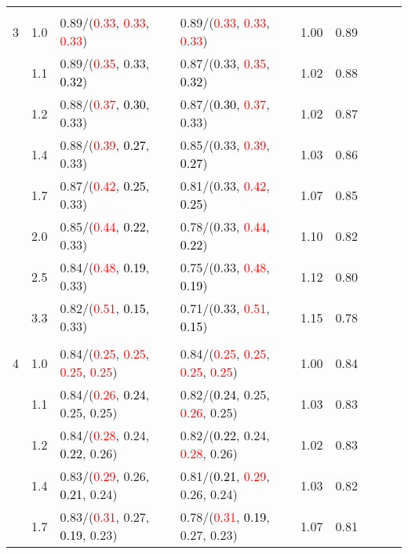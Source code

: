 \documentclass[10pt,a4paper]{report}
\begin{document}
\begin{table}[!htbp]
\begin{center}
{\begin{tabular}{ccllccccc}
			&&&&\\
			3			&1.0&0.89/(\textcolor{red}{0.33}, \textcolor{red}{0.33}, \textcolor{red}{0.33})&0.89/(\textcolor{red}{0.33}, \textcolor{red}{0.33}, \textcolor{red}{0.33})&1.00&0.89\\
			&1.1&0.89/(\textcolor{red}{0.35}, 0.33, \textcolor{black}{0.32})&0.87/(0.33, \textcolor{red}{0.35}, \textcolor{black}{0.32})&1.02&0.88\\
			&1.2&0.88/(\textcolor{red}{0.37}, \textcolor{black}{0.30}, 0.33)&0.87/(\textcolor{black}{0.30}, \textcolor{red}{0.37}, 0.33)&1.02&0.87\\
			&1.4&0.88/(\textcolor{red}{0.39}, \textcolor{black}{0.27}, 0.33)&0.85/(0.33, \textcolor{red}{0.39}, \textcolor{black}{0.27})&1.03&0.86\\
			&1.7&0.87/(\textcolor{red}{0.42}, \textcolor{black}{0.25}, 0.33)&0.81/(0.33, \textcolor{red}{0.42}, \textcolor{black}{0.25})&1.07&0.85\\
			&2.0&0.85/(\textcolor{red}{0.44}, \textcolor{black}{0.22}, 0.33)&0.78/(0.33, \textcolor{red}{0.44}, \textcolor{black}{0.22})&1.10&0.82\\
			&2.5&0.84/(\textcolor{red}{0.48}, \textcolor{black}{0.19}, 0.33)&0.75/(0.33, \textcolor{red}{0.48}, \textcolor{black}{0.19})&1.12&0.80\\
			&3.3&0.82/(\textcolor{red}{0.51}, \textcolor{black}{0.15}, 0.33)&0.71/(0.33, \textcolor{red}{0.51}, \textcolor{black}{0.15})&1.15&0.78\\
			&&&&\\
			4			&1.0&0.84/(\textcolor{red}{0.25}, \textcolor{red}{0.25}, \textcolor{red}{0.25}, \textcolor{red}{0.25})&0.84/(\textcolor{red}{0.25}, \textcolor{red}{0.25}, \textcolor{red}{0.25}, \textcolor{red}{0.25})&1.00&0.84\\
			&1.1&0.84/(\textcolor{red}{0.26}, \textcolor{black}{0.24}, 0.25, 0.25)&0.82/(\textcolor{black}{0.24}, 0.25, \textcolor{red}{0.26}, 0.25)&1.03&0.83\\
			&1.2&0.84/(\textcolor{red}{0.28}, 0.24, \textcolor{black}{0.22}, 0.26)&0.82/(\textcolor{black}{0.22}, 0.24, \textcolor{red}{0.28}, 0.26)&1.02&0.83\\
			&1.4&0.83/(\textcolor{red}{0.29}, 0.26, \textcolor{black}{0.21}, 0.24)&0.81/(\textcolor{black}{0.21}, \textcolor{red}{0.29}, 0.26, 0.24)&1.03&0.82\\
			&1.7&0.83/(\textcolor{red}{0.31}, 0.27, \textcolor{black}{0.19}, 0.23)&0.78/(\textcolor{red}{0.31}, \textcolor{black}{0.19}, 0.27, 0.23)&1.07&0.81\\

\end{tabular}}
\end{center}
\end{table}
\end{document}
